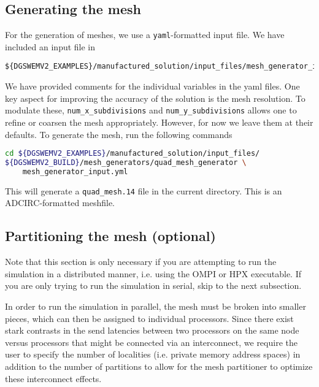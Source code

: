 \subsection{Generating the mesh}
For the generation of meshes, we use a \lstinline{yaml}-formatted input file. We have included an input file in
\begin{lstlisting}
${DGSWEMV2_EXAMPLES}/manufactured_solution/input_files/mesh_generator_input.yml
\end{lstlisting}
We have provided comments for the individual variables in the yaml files. One key aspect for improving the accuracy of the solution is the mesh resolution. To modulate these, \lstinline{num_x_subdivisions} and \lstinline{num_y_subdivisions} allows one to refine or coarsen the mesh appropriately. However, for now we leave them at their defaults. To generate the mesh, run the following commands
\begin{lstlisting}[language=bash]
cd ${DGSWEMV2_EXAMPLES}/manufactured_solution/input_files/
${DGSWEMV2_BUILD}/mesh_generators/quad_mesh_generator \
    mesh_generator_input.yml
\end{lstlisting}
This will generate a \lstinline{quad_mesh.14} file in the current directory. This is an ADCIRC-formatted meshfile.

\subsection{Partitioning the mesh (optional)}
Note that this section is only necessary if you are attempting to run the simulation in a distributed manner, i.e. using the OMPI or HPX executable. If you are only trying to run the simulation in serial, skip to the next subsection.

In order to run the simulation in parallel, the mesh must be broken into smaller pieces, which can then be assigned to individual processors. Since there exist stark contrasts in the send latencies between two processors on the same node versus processors that might be connected via an interconnect, we require the user to specify the number of localities (i.e. private memory address spaces) in addition to the number of partitions to allow for the mesh partitioner to optimize these interconnect effects.

